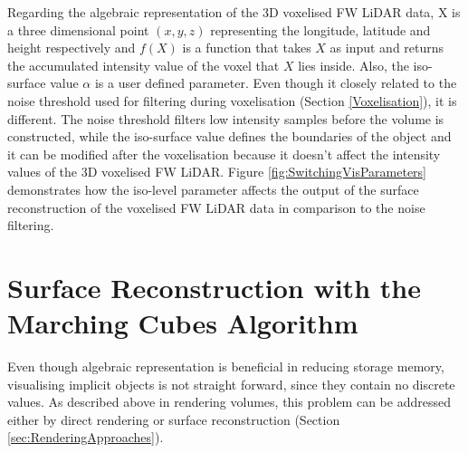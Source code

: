 \documentclass{subfiles}
\begin{document}
\par Regarding the algebraic representation of the 3D voxelised FW LiDAR data, X is a three dimensional point $\mathit{(x, y, z) }$ representing the longitude, latitude and height respectively and ${f(X)}$ is a function that takes  $\mathit{X}$ as input and returns the accumulated intensity value of the voxel that  $\mathit{X}$ lies inside. {\color{Fuchsia} Also, the iso-surface value $\mathit{\alpha }$ is a user defined parameter. Even though it closely related to the noise threshold used for filtering during voxelisation (Section \ref{Voxelisation}), it is different. The noise threshold filters low intensity samples before the volume is constructed, while the iso-surface value defines the boundaries of the object and it can be modified after the voxelisation because it doesn't affect the intensity values of the 3D voxelised FW LiDAR. Figure \ref{fig:SwitchingVisParameters} demonstrates how the iso-level parameter affects the output of the surface reconstruction of the voxelised FW LiDAR data in comparison to the noise filtering}.

\section {Surface Reconstruction with the Marching Cubes Algorithm}\label{sec:SurfaceReconstruction}

\par Even though algebraic representation is beneficial in reducing storage memory, visualising implicit objects is not straight forward, since they contain no discrete values. As described above in rendering volumes, this problem can be addressed either by direct rendering or surface reconstruction (Section \ref{sec:RenderingApproaches}). 
\end{document}
